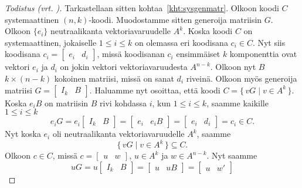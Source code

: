 \documentclass[a4paper,12pt,leqno,oneside]{report} %
\theoremstyle{plain}
\theoremstyle{plain}
\theoremstyle{definition}
\theoremstyle{remark}
\numberwithin{equation}{chapter}
\begin{document}
\begin{proof}[Todistus \upshape(vrt. {\cite[s.~498]{PA}})]
        Tarkastellaan sitten kohtaa~\ref{kht:sysgenmatr}. Olkoon koodi $C$ systemaattinen $(n, k)$-koodi. Muodostamme sitten generoija matriisin $G$. Olkoon $\{e_i\}$ neutraalikanta vektoriavaruudelle $A^k$. Koska koodi $C$ on systemaattinen, jokaiselle $1 \le i \le k$ on olemassa eri koodisana $c_i \in C$. Nyt siis koodisana 
        $c_i = 
        \begin{bmatrix}
            e_i & d_i
        \end{bmatrix}
        $, missä koodisanan $c_i$ ensimmäiset $k$ komponenttia ovat vektori $e_i$ ja $d_i$ on jokin vektori vektoriavaruudesta $A^{n-k}$. Olkoon nyt $B$ $k \times (n-k)$ kokoinen matriisi, missä on sanat $d_i$ riveinä. Olkoon myös generoija matriisi 
        $G =  
        \begin{bmatrix}
            I_k & B
        \end{bmatrix}$.
        Haluamme nyt osoittaa, että koodi $C = \{\,vG \mid v \in A^k\,\}$. Koska $e_i B$ on matriisin $B$ rivi kohdassa $i$, kun $1 \le i \le k$, saamme kaikille $1 \le i \le k$
        \[
            e_i G = e_i
            \begin{bmatrix}
                I_k & B
            \end{bmatrix}
            =
            \begin{bmatrix}
                e_i & e_i B
            \end{bmatrix}
            =
            \begin{bmatrix}
                e_i & d_i
            \end{bmatrix}
            =
            c_i \in C.
        \]
        Nyt koska $e_i$ oli neutraalikanta vektoriavaruudelle $A^k$, saamme
        \[
            \{\,vG \mid v \in A^k\,\} \subseteq C.
        \]
        Olkoon $c \in C$, missä 
        $c = 
        \begin{bmatrix}
            u & w
        \end{bmatrix}$, $u \in A^k
        $ ja $w \in A^{n-k}$. Nyt saamme
        \[
            uG = u
            \begin{bmatrix}
                I_k & B  
            \end{bmatrix}
            = 
            \begin{bmatrix}
                u & uB
            \end{bmatrix}
            = 
            \begin{bmatrix}
                u & w'  
            \end{bmatrix}
\]
\end{proof}
\end{document}
